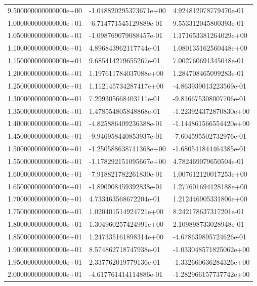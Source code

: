 \documentclass[pdf,color]{UoBnote}
\begin{document}
\begin{table}[H]
{\begin{tabular}{l|l|l}
    9.500000000000000e+00 & -1.048820295373671e+00 & 4.924812078779470e-01  \\
    1.000000000000000e+01 & -6.714771545129889e-01 & 9.553312045800393e-01  \\
    1.050000000000000e+01 & -1.098769079088457e-01 & 1.171653381264029e+00  \\
    1.100000000000000e+01 & 4.896843962117744e-01  & 1.080135162560448e+00  \\
    1.150000000000000e+01 & 9.685414279655267e-01  & 7.002760691345048e-01  \\
    1.200000000000000e+01 & 1.197611784037088e+00  & 1.284708465099283e-01  \\
    1.250000000000000e+01 & 1.112145734287417e+00  & -4.863939013223569e-01 \\
    1.300000000000000e+01 & 7.299305668403111e-01  & -9.816675308007706e-01 \\
    1.350000000000000e+01 & 1.478554805848868e-01  & -1.223924372870830e+00 \\
    1.400000000000000e+01 & -4.825886409236388e-01 & -1.144861566554420e+00 \\
    1.450000000000000e+01 & -9.946958440853937e-01 & -7.604595502732976e-01 \\
    1.500000000000000e+01 & -1.250588638711368e+00 & -1.680541844464385e-01 \\
    1.550000000000000e+01 & -1.178292151095667e+00 & 4.782469079650504e-01  \\
    1.600000000000000e+01 & -7.918821782261830e-01 & 1.007612120017253e+00  \\
    1.650000000000000e+01 & -1.890908459392838e-01 & 1.277601694128188e+00  \\
    1.700000000000000e+01 & 4.733463568672204e-01  & 1.212446905331806e+00  \\
    1.750000000000000e+01 & 1.020401514924721e+00  & 8.242178637317201e-01  \\
    1.800000000000000e+01 & 1.304960257424991e+00  & 2.109898733028948e-01  \\
    1.850000000000000e+01 & 1.247335161898314e+00  & -4.678639895724626e-01 \\
    1.900000000000000e+01 & 8.574862718747938e-01  & -1.033048571825062e+00 \\
    1.950000000000000e+01 & 2.337762019779136e-01  & -1.332660636284326e+00 \\
    2.000000000000000e+01 & -4.617761414114886e-01 & -1.282966157737742e+00 \\

\end{tabular}}
\end{table}
\end{document}
